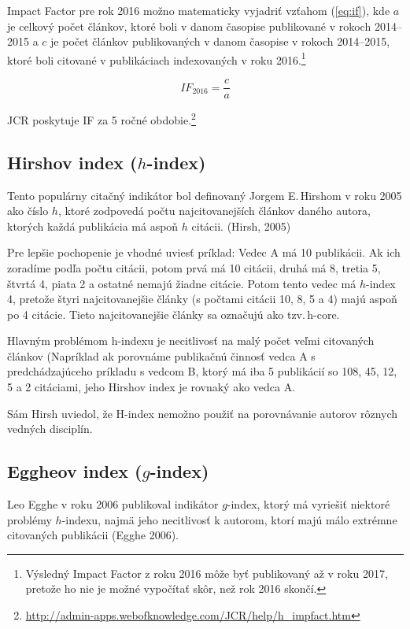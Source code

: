 Impact Factor pre rok 2016 možno matematicky vyjadriť vzťahom (\ref{eq:if}), kde
$a$ je celkový počet článkov, ktoré boli v danom časopise publikované v rokoch
2014--2015 a $c$ je počet článkov publikovaných v danom časopise v rokoch
2014--2015, ktoré boli citované v publikáciach indexovaných v roku
2016.\footnote{Výsledný Impact Factor z roku 2016 môže byť publikovaný až v roku
  2017, pretože ho nie je možné vypočítať skôr, než rok 2016 skončí.}

\begin{equation}
\label{eq:if}
\mathit{IF}_{2016} = \frac{c}{a}
\end{equation}

JCR poskytuje IF za 5 ročné obdobie.\footnote{\url{http://admin-apps.webofknowledge.com/JCR/help/h_impfact.htm}}


\subsection{Hirshov index ($h$-index)}

Tento populárny citačný indikátor bol definovaný Jorgem E.\,Hirshom v roku 2005
ako číslo $h$, ktoré zodpovedá počtu najcitovanejších článkov daného autora,
ktorých každá publikácia má aspoň $h$ citácii.  (Hirsh, 2005)

Pre lepšie pochopenie je vhodné uviesť príklad: Vedec A má 10 publikácii.  Ak
ich zoradíme podľa počtu citácii, potom prvá má 10 citácii, druhá má 8, tretia
5, štvrtá 4, piata 2 a ostatné nemajú žiadne citácie.  Potom tento vedec má
$h$-index 4, pretože štyri najcitovanejšie články (s počtami citácii 10, 8, 5 a
4) majú aspoň po 4 citácie.  Tieto najcitovanejšie články sa označujú ako
tzv.\,h-core.

Hlavným problémom h-indexu je necitlivosť na malý počet veľmi citovaných článkov
(Napríklad ak porovnáme publikačnú činnosť vedca A s predchádzajúceho príkladu s
vedcom B, ktorý má iba 5 publikácií so 108, 45, 12, 5 a 2 citáciami, jeho
Hirshov index je rovnaký ako vedca A.

Sám Hirsh uviedol, že H-index nemožno použiť na porovnávanie autorov rôznych
vedných disciplín.


\subsection{Eggheov index ($g$-index)}

Leo Egghe v roku 2006 publikoval indikátor $g$-index, ktorý má vyriešiť niektoré
problémy $h$-indexu, najmä jeho necitlivosť k autorom, ktorí majú málo extrémne
citovaných publikácii (Egghe 2006).

